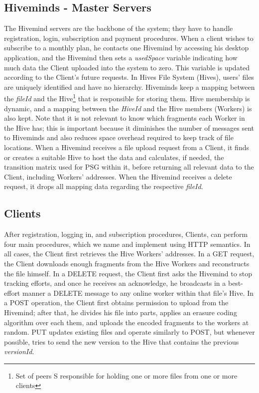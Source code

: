\documentclass[runningheads]{llncs}
\begin{document}
\subsection{Hiveminds - Master Servers}
The Hivemind servers are the backbone of the system; they have to handle registration, login, subscription and payment procedures. When a client wishes to subscribe to a monthly plan, he contacts one Hivemind by accessing his desktop application, and the Hivemind then sets a \textit{usedSpace} variable indicating how much data the Client uploaded into the system to zero. This variable is updated according to the Client's future requests. In Hives File System (Hives), users' files are uniquely identified and have no hierarchy. Hiveminds keep a mapping between the \textit{fileId} and the Hive\footnote{Set of peers S responsible for holding one or more files from one or more clients} that is responsible for storing them. Hive membership is dynamic, and a mapping between the \textit{HiveId} and the Hive members (Workers) is also kept. Note that it is not relevant to know which fragments each Worker in the Hive has; this is important because it diminishes the number of messages sent to Hiveminds and also reduces space overhead required to keep track of file locations. When a Hivemind receives a file upload request from a Client, it finds or creates a suitable Hive to host the data and calculates, if needed, the transition matrix used for PSG within it, before returning all relevant data to the Client, including Workers' addresses. When the Hivemind receives a delete request, it drops all mapping data regarding the respective \textit{fileId}.

\subsection{Clients}
After registration, logging in, and subscription procedures, Clients, can perform four main procedures, which we name and implement using HTTP semantics. In all cases, the Client first retrieves the Hive Workers' addresses. In a GET request, the Client downloads enough fragments from the Hive Workers and reconstructs the file himself. In a DELETE request, the Client first asks the Hivemind to stop tracking efforts, and once he receives an acknowledge, he broadcasts in a best-effort manner a DELETE message to any online worker within that file's Hive. In a POST operation, the Client first obtains permission to upload from the Hivemind; after that, he divides his file into parts, applies an erasure coding algorithm over each them, and uploads the encoded fragments to the workers at random. PUT updates existing files and operate similarly to POST, but whenever possible, tries to send the new version to the Hive that contains the previous \textit{versionId}.
\end{document}
